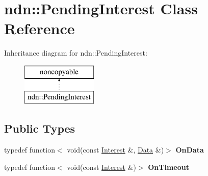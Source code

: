 \hypertarget{classndn_1_1PendingInterest}{}\section{ndn\+:\+:Pending\+Interest Class Reference}
\label{classndn_1_1PendingInterest}
Inheritance diagram for ndn\+:\+:Pending\+Interest\+:\begin{figure}[H]
\begin{center}
\leavevmode
\includegraphics[height=2.000000cm]{classndn_1_1PendingInterest}
\end{center}
\end{figure}
\subsection*{Public Types}
\begin{DoxyCompactItemize}
\item 
typedef function$<$ void(const \hyperlink{classndn_1_1Interest}{Interest} \&, \hyperlink{classndn_1_1Data}{Data} \&)$>$ {\bfseries On\+Data}\hypertarget{classndn_1_1PendingInterest_a8f051d07bd4efe3aa9b81094ab64f8b8}{}\label{classndn_1_1PendingInterest_a8f051d07bd4efe3aa9b81094ab64f8b8}

\item 
typedef function$<$ void(const \hyperlink{classndn_1_1Interest}{Interest} \&)$>$ {\bfseries On\+Timeout}\hypertarget{classndn_1_1PendingInterest_acdb0c0e4e0a3f63a152c60fda52b05d7}{}\label{classndn_1_1PendingInterest_acdb0c0e4e0a3f63a152c60fda52b05d7}

\end{DoxyCompactItemize}
